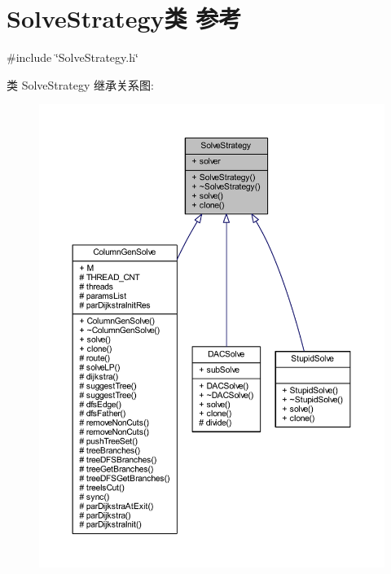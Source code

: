 \hypertarget{classSolveStrategy}{}\section{Solve\+Strategy类 参考}
\label{classSolveStrategy}


{\ttfamily \#include \char`\"{}Solve\+Strategy.\+h\char`\"{}}



类 Solve\+Strategy 继承关系图\+:
\nopagebreak
\begin{figure}[H]
\begin{center}
\leavevmode
\includegraphics[width=350pt]{classSolveStrategy__inherit__graph}
\end{center}
\end{figure}


